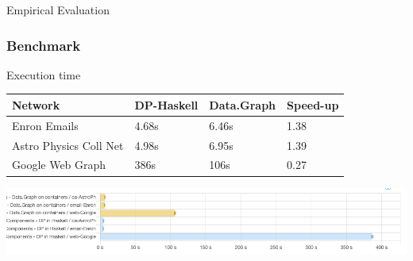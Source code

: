 \documentclass{beamer}
\begin{document}
  \begin{frame}[fragile]{Empirical Evaluation}
    \frametitle{Benchmark}

    \begin{block}{Execution time}
    \begin{table}[H]
      \centering
      \begin{tabular}{|l|l|l|l|}
       \hline
       \textbf{Network} & \textbf{DP-Haskell} & \textbf{Data.Graph} & \textbf{Speed-up}\\
       \hline
       Enron Emails & 4.68s &  6.46s & 1.38\\
       \hline
       Astro Physics Coll Net & 4.98s & 6.95s  & 1.39\\
       \hline
       Google Web Graph & 386s & 106s & \color{red}0.27\\
       \hline
      \end{tabular}
     \end{table}      
    \end{block}

     \vspace{1cm}

    \begin{minipage}[t]{\linewidth}
      \includegraphics[width=\textwidth]{bench_2}
    \end{minipage}
  \end{frame}
\end{document}
